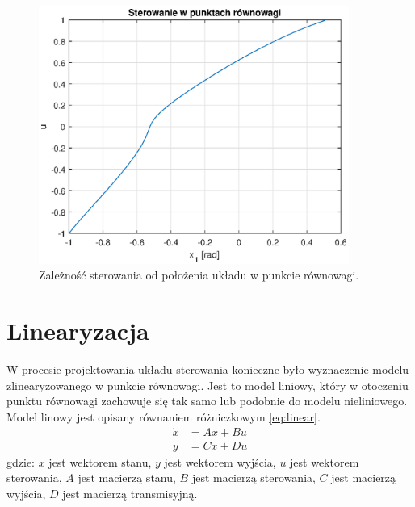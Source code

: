 \documentclass[11pt,a4paper]{article}
\begin{document}
\begin{figure}[H]
	\centering
	\includegraphics[width=4in]{Figures/e_p_x1_u.eps}
	\caption{Zależność sterowania od położenia układu w punkcie równowagi.}
	\label{fig:e_p_x1_u}
\end{figure}

\section{Linearyzacja}
\label{sec:linearyzacja}
W procesie projektowania układu sterowania konieczne było wyznaczenie modelu zlinearyzowanego w punkcie równowagi. Jest to model liniowy, który w otoczeniu punktu równowagi zachowuje się tak samo lub podobnie do modelu nieliniowego. Model linowy jest opisany równaniem różniczkowym \eqref{eq:linear}.
\begin{equation}
\begin{aligned}
\dot x &= Ax+Bu\\
y &= Cx+Du
\end{aligned}
\label{eq:linear}
\end{equation}
\noindent gdzie:\newline
\(x\) jest wektorem stanu,\newline
\(y\) jest wektorem wyjścia,\newline
\(u\) jest wektorem sterowania,\newline
\(A\) jest macierzą stanu,\newline
\(B\) jest macierzą sterowania,\newline
\(C\) jest macierzą wyjścia,\newline
\(D\) jest macierzą transmisyjną.
\end{document}
